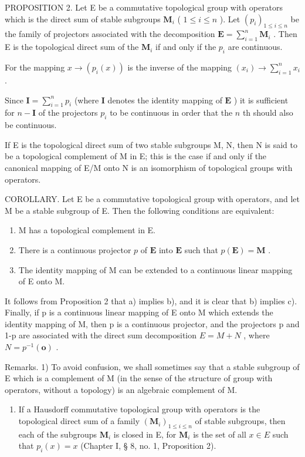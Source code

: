 PROPOSITION 2. Let E be a commutative topological group with operators which is the direct sum of stable subgroups \(\mathbf{M}_i\) ( \(1 \leqslant i \leqslant n\) ). Let \((p_i)_{1 \leqslant i \leqslant n}\) be the family of projectors associated with the decomposition \(\mathbf{E} = \sum_{i=1}^{n} \mathbf{M}_i\) . Then E is the topological direct sum of the \(\mathbf{M}_i\) if and only if the \(p_i\) are continuous.

For the mapping \(x \to (p_i(x))\) is the inverse of the mapping \((x_i) \to \sum_{i=1}^{n} x_i\) .

Since \(\mathbf{I} = \sum_{i=1}^{n} p_i\) (where \(\mathbf{I}\) denotes the identity mapping of \(\mathbf{E}\) ) it is sufficient for \(n - \mathbf{I}\) of the projectors \(p_i\) to be continuous in order that the \(n\) th should also be continuous.

If E is the topological direct sum of two stable subgroups M, N, then N is said to be a topological complement of M in E; this is the case if and only if the canonical mapping of E/M onto N is an isomorphism of topological groups with operators.

COROLLARY. Let E be a commutative topological group with operators, and let M be a stable subgroup of E. Then the following conditions are equivalent:

\begin{enumerate}
\def\labelenumi{\alph{enumi})}
\item
  M has a topological complement in E.
\item
  There is a continuous projector \(p\) of \(\mathbf{E}\) into \(\mathbf{E}\) such that \(p(\mathbf{E}) = \mathbf{M}\) .
\item
  The identity mapping of M can be extended to a continuous linear mapping of E onto M.
\end{enumerate}

It follows from Proposition 2 that a) implies b), and it is clear that b) implies c). Finally, if p is a continuous linear mapping of E onto M which extends the identity mapping of M, then p is a continuous projector, and the projectors p and 1-p are associated with the direct sum decomposition \(E = M + N\) , where \(N = p^{-1}(\mathbf{o})\) .

Remarks. 1) To avoid confusion, we shall sometimes say that a stable subgroup of E which is a complement of M (in the sense of the structure of group with operators, without a topology) is an algebraic complement of M.

\begin{enumerate}
\def\labelenumi{\arabic{enumi})}
\setcounter{enumi}{1}
\tightlist
\item
  If a Hausdorff commutative topological group with operators is the topological direct sum of a family \((\mathbf{M}_i)_{1\leqslant i\leqslant n}\) of stable subgroups, then each of the subgroups \(\mathbf{M}_i\) is closed in E, for \(\mathbf{M}_i\) is the set of all \(x\in E\) such that \(p_i(x) = x\) (Chapter I, § 8, no. 1, Proposition 2).
\end{enumerate}

